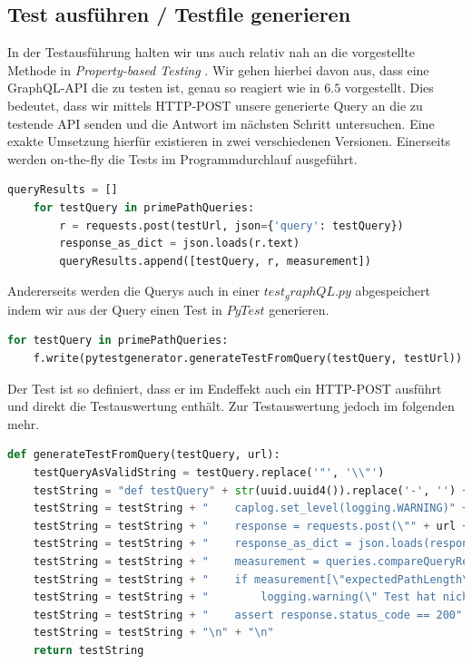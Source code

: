 \subsection{Test ausführen / Testfile generieren}

In der Testausführung halten wir uns auch relativ nah an die vorgestellte Methode in \textit{Property-based Testing} \cite{property-based-testing}.
Wir gehen hierbei davon aus, dass eine GraphQL-API die zu testen ist, genau so reagiert wie in $6.5$ vorgestellt.
Dies bedeutet, dass wir mittels HTTP-POST unsere generierte Query an die zu testende API senden und die Antwort
im nächsten Schritt untersuchen.
Eine exakte Umsetzung hierfür existieren in zwei verschiedenen Versionen.
Einerseits werden on-the-fly die Tests im Programmdurchlauf ausgeführt.

\begin{lstlisting}[language=Python]
    queryResults = []
    for testQuery in primePathQueries:
        r = requests.post(testUrl, json={'query': testQuery})
        response_as_dict = json.loads(r.text)
        queryResults.append([testQuery, r, measurement])
\end{lstlisting}

Andererseits werden die Querys auch in einer $test_graphQL.py$ abgespeichert indem
wir aus der Query einen Test in $PyTest$ generieren.

\begin{lstlisting}[language=Python]
for testQuery in primePathQueries:
    f.write(pytestgenerator.generateTestFromQuery(testQuery, testUrl))
\end{lstlisting}

Der Test ist so definiert, dass er im Endeffekt auch ein HTTP-POST ausführt und direkt die Testauswertung enthält.
Zur Testauswertung jedoch im folgenden mehr.

\begin{lstlisting}[language=Python]
def generateTestFromQuery(testQuery, url):
    testQueryAsValidString = testQuery.replace('"', '\\"')
    testString = "def testQuery" + str(uuid.uuid4()).replace('-', '') + "(caplog):" + "\n"
    testString = testString + "    caplog.set_level(logging.WARNING)" + "\n"
    testString = testString + "    response = requests.post(\"" + url + "\"," "json={\'query\':\"" + testQueryAsValidString + "\"})" + "\n"
    testString = testString + "    response_as_dict = json.loads(response.text)"  + "\n"
    testString = testString + "    measurement = queries.compareQueryResults(response_as_dict, " + "\"" + testQueryAsValidString + "\"" + ")" + "\n"
    testString = testString + "    if measurement[\"expectedPathLength\"] > measurement[\"pathLengthFromResult\"]:" + "\n"
    testString = testString + "        logging.warning(\" Test hat nicht 100% Abdeckung \")" + "\n"
    testString = testString + "    assert response.status_code == 200" + "\n"
    testString = testString + "\n" + "\n"
    return testString
\end{lstlisting}


